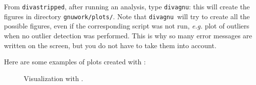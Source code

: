 From \texttt{divastripped}, after running an analysis, type \texttt{divagnu}: this will create the figures in directory \texttt{gnuwork/plots/}.
Note that \texttt{divagnu}\, will try to create all the possible figures, even if the corresponding script was not run, \textit{e.g.} plot of outliers when no outlier detection was performed. This is why so many error messages are written on the screen, but you do not have to take them into account.

%

Here are some examples of plots created with \gnuplot:

\begin{figure}[htpb]
\centering
{}

\caption{Visualization with \gnuplot.\label{fig:gnuplotexamples}}
\end{figure}


